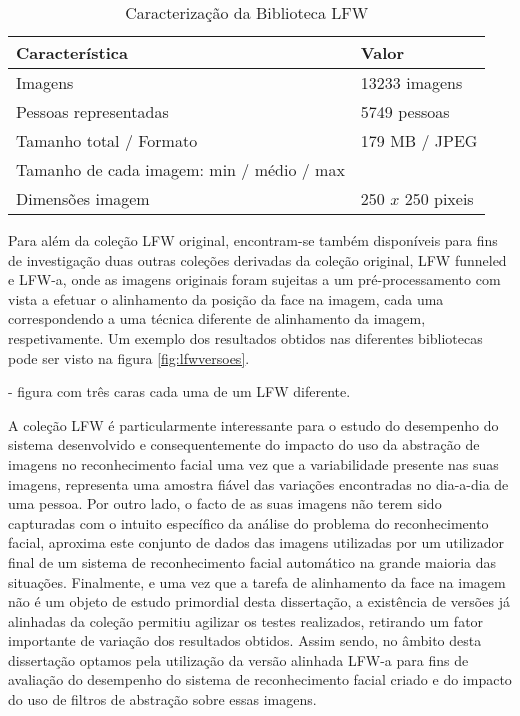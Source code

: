 \begin{center}
\begin{table}
	\caption{Caracterização da Biblioteca LFW}
	\begin{center}
    \begin{tabular}{ll}
    \hline
    Característica                            & Valor            \\ \hline
    Imagens                                   & 13233 imagens    \\
    Pessoas representadas                     & 5749 pessoas     \\
    Tamanho total / Formato                   & 179 MB / JPEG    \\
    Tamanho de cada imagem: min / médio / max & ~                \\
    Dimensões imagem                          & 250 $x$ 250 pixeis \\
    \hline
    \end{tabular}
	\label{tab:lfw}
	\end{center}
\end{table}
\end{center}

Para além da coleção LFW original, encontram-se também disponíveis para fins de investigação duas outras coleções derivadas da coleção original, LFW funneled e LFW-a, onde as imagens originais foram sujeitas a um pré-processamento com vista a efetuar o alinhamento da posição da face na imagem, cada uma correspondendo a uma técnica diferente de alinhamento da imagem, respetivamente. Um exemplo dos resultados obtidos nas diferentes bibliotecas pode ser visto na figura \ref{fig:lfwversoes}.

- figura com três caras cada uma de um LFW diferente.

A coleção LFW é particularmente interessante para o estudo do desempenho do sistema desenvolvido e consequentemente do impacto do uso da abstração de imagens no reconhecimento facial uma vez que a variabilidade presente nas suas imagens, representa uma amostra fiável das variações encontradas no dia-a-dia de uma pessoa. Por outro lado, o facto de as suas imagens não terem sido capturadas com o intuito específico da análise do problema do reconhecimento facial, aproxima este conjunto de dados das imagens utilizadas por um utilizador final de um sistema de reconhecimento facial automático na grande maioria das situações. Finalmente, e uma vez que a tarefa de alinhamento da face na imagem não é um objeto de estudo primordial desta dissertação, a existência de versões já alinhadas da coleção permitiu agilizar os testes realizados, retirando um fator importante de variação dos resultados obtidos. Assim sendo, no âmbito desta dissertação optamos pela utilização da versão alinhada LFW-a \citep{autor} para fins de avaliação do desempenho do sistema de reconhecimento facial criado e do impacto do uso de filtros de abstração sobre essas imagens.

